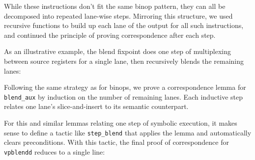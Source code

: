 While these instructions don't fit the same binop pattern, they can all be decomposed into repeated lane-wise steps. Mirroring this structure, we used recursive functions to build up each lane of the output for all such instructions, and continued the principle of proving correspondence after each step.

As an illustrative example, the blend fixpoint does one step of multiplexing between source registers for a single lane, then recursively blends the remaining lanes:


Following the same strategy as for binops, we prove a correspondence lemma for \texttt{blend_aux} by induction on the number of remaining lanes. Each inductive step relates one lane's slice-and-insert to its semantic counterpart.


For this and similar lemmas relating one step of symbolic execution, it makes sense to define a tactic like \texttt{step_blend} that applies the lemma and automatically clears preconditions. With this tactic, the final proof of correspondence for \texttt{vpblendd} reduces to a single line:

